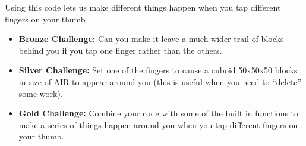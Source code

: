 \documentclass{geocraft-worksheet-multipage}
\begin{document}
\noindent Using this code lets us make different things happen when you tap different fingers on your thumb

\begin{itemize}
\item\textbf{Bronze Challenge:} Can you make it leave a much wider trail of blocks behind you if you tap one finger
  rather than the others.

\item\textbf{Silver Challenge:} Set one of the fingers to cause a cuboid 50x50x50 blocks in size of AIR to appear around
  you (this is useful when you need to ``delete'' some work).

\item\textbf{Gold Challenge:} Combine your code with some of the built in functions to make a series of things happen
  around you when you tap different fingers on your thumb.

\end{itemize}
\end{document}
